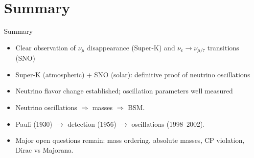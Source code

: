 \documentclass{beamer}
\begin{document}
\section{Summary}

\begin{frame}{Summary}
\begin{itemize}
    \item Clear observation of $\nu_\mu$ disappearance (Super-K) and $\nu_e \to \nu_{\mu/\tau}$ transitions (SNO)
    \item Super-K (atmospheric) + SNO (solar): definitive proof of neutrino oscillations
    \item Neutrino flavor change established; oscillation parameters well measured
    \item Neutrino oscillations $\Rightarrow$ masses $\Rightarrow$ BSM.
    \item Pauli (1930) $\to$ detection (1956) $\to$ oscillations (1998--2002).
    \item Major open questions remain: mass ordering, absolute masses, CP violation, Dirac vs Majorana.
\end{itemize}
\end{frame}
\end{document}
